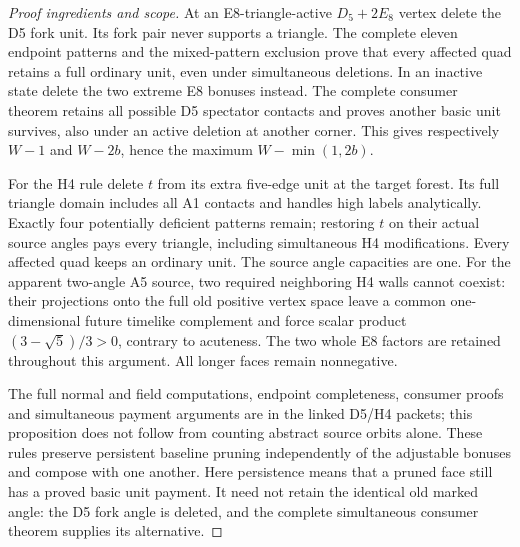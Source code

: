 \documentclass[11pt]{article}
\begin{document}
\begin{proof}[Proof ingredients and scope]
At an E8-triangle-active $D_5+2E_8$ vertex delete the D5 fork unit. Its
fork pair never supports a triangle. The complete eleven endpoint
patterns and the mixed-pattern exclusion prove that every affected quad
retains a full ordinary unit, even under simultaneous deletions. In an
inactive state delete the two extreme E8 bonuses instead. The complete
consumer theorem retains all possible D5 spectator contacts and proves
another basic unit survives, also under an active deletion at another
corner. This gives respectively $W-1$ and $W-2b$, hence the maximum
$W-\min(1,2b)$.

For the H4 rule delete $t$ from its extra five-edge unit at the target
forest. Its full triangle domain includes all A1 contacts and handles
high labels analytically. Exactly four potentially deficient patterns
remain; restoring $t$ on their actual source angles pays every triangle,
including simultaneous H4 modifications. Every affected quad keeps an
ordinary unit. The source angle capacities are one. For the apparent
two-angle A5 source, two required neighboring H4 walls cannot coexist:
their projections onto the full old positive vertex space leave a common
one-dimensional future timelike complement and force scalar product
$(3-\sqrt5)/3>0$, contrary to acuteness. The two whole E8 factors are
retained throughout this argument. All longer faces remain nonnegative.

The full normal and field computations, endpoint completeness, consumer
proofs and simultaneous payment arguments are in the linked D5/H4 packets;
this proposition does not follow from counting abstract source orbits
alone. These rules preserve persistent baseline pruning independently
of the adjustable bonuses and compose with one another. Here persistence
means that a pruned face still has a proved basic unit payment. It need
not retain the identical old marked angle: the D5 fork angle is deleted,
and the complete simultaneous consumer theorem supplies its alternative.
\end{proof}
\end{document}
